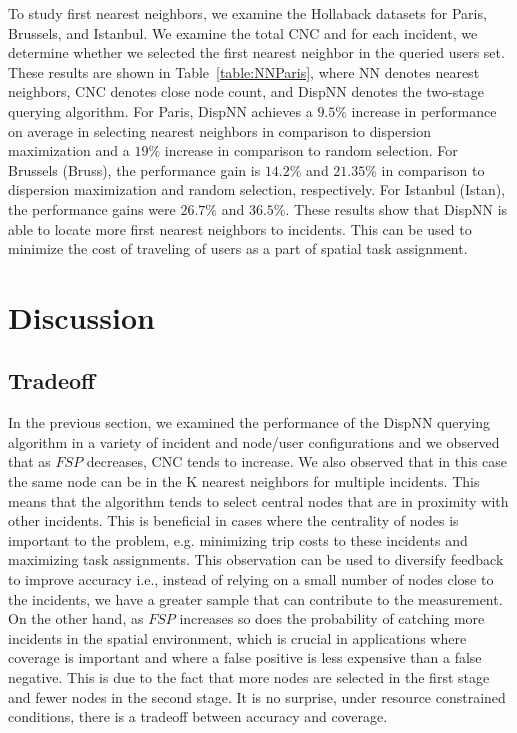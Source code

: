 \documentclass{acm_proc_article-sp}
\begin{document}
To study first nearest neighbors, we examine the Hollaback datasets for Paris, Brussels, and Istanbul. We examine the total CNC and for each incident, we determine whether we selected the first nearest neighbor in the queried users set. These results are shown in Table~\ref{table:NNParis}, where NN denotes nearest neighbors, CNC denotes close node count, and DispNN denotes the two-stage querying algorithm. For Paris, DispNN achieves a $9.5\%$ increase in performance on average in selecting nearest neighbors in comparison to dispersion maximization and a $19\%$ increase in comparison to random selection. For Brussels (Bruss), the performance gain is $14.2\%$ and $21.35\%$ in comparison to dispersion maximization and random selection, respectively. For Istanbul (Istan), the performance gains were $26.7\%$ and $36.5\%$. These results show that DispNN is able to locate more first nearest neighbors to incidents. This can be used to minimize the cost of traveling of users as a part of spatial task assignment. 

\section{Discussion}
\subsection{Tradeoff}
In the previous section, we examined the performance of the DispNN querying algorithm in a variety of incident and node/user configurations and we observed that as $FSP$ decreases, CNC tends to increase. We also observed that in this case the same node can be in the K nearest neighbors for multiple incidents. This means that the algorithm tends to select central nodes that are in proximity with other incidents. This is beneficial in cases where the centrality of nodes is important to the problem, e.g. minimizing trip costs to these incidents and maximizing task assignments. This observation can be used to diversify feedback to improve accuracy i.e., instead of relying on a small number of nodes close to the incidents, we have a greater sample that can contribute to the measurement.
On the other hand, as $FSP$ increases so does the probability of catching more incidents in the spatial environment, which is crucial in applications where coverage is important and where a false positive is less expensive than a false negative. This is due to the fact that more nodes are selected in the first stage and fewer nodes in the second stage. It is no surprise, under resource constrained conditions, there is a tradeoff between accuracy and coverage.
\end{document}
